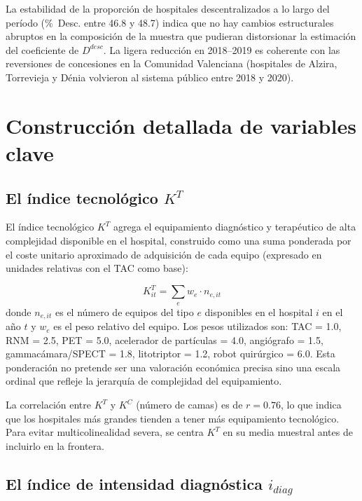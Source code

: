 \documentclass[12pt, a4paper, twoside, openright]{book}
\theoremstyle{plain}
\theoremstyle{definition}
\theoremstyle{remark}
\begin{document}
La estabilidad de la proporción de hospitales descentralizados a lo largo del período (\%~Desc. entre 46.8 y 48.7) indica que no hay cambios estructurales abruptos en la composición de la muestra que pudieran distorsionar la estimación del coeficiente de $D^{desc}$. La ligera reducción en 2018--2019 es coherente con las reversiones de concesiones en la Comunidad Valenciana (hospitales de Alzira, Torrevieja y Dénia volvieron al sistema público entre 2018 y 2020).

\section{Construcción detallada de variables clave}
\label{sec:construccion_variables}

\subsection{El índice tecnológico \texorpdfstring{$K^T$}{K\^{}T}}

El índice tecnológico $K^T$ agrega el equipamiento diagnóstico y terapéutico de alta complejidad disponible en el hospital, construido como una suma ponderada por el coste unitario aproximado de adquisición de cada equipo (expresado en unidades relativas con el TAC como base):

\begin{equation}
  K^T_{it} = \sum_e w_e \cdot n_{e,it}
  \label{eq:kt}
\end{equation}
donde $n_{e,it}$ es el número de equipos del tipo $e$ disponibles en el hospital $i$ en el año $t$ y $w_e$ es el peso relativo del equipo. Los pesos utilizados son: TAC = 1.0, RNM = 2.5, PET = 5.0, acelerador de partículas = 4.0, angiógrafo = 1.5, gammacámara/SPECT = 1.8, litotriptor = 1.2, robot quirúrgico = 6.0. Esta ponderación no pretende ser una valoración económica precisa sino una escala ordinal que refleje la jerarquía de complejidad del equipamiento.

La correlación entre $K^T$ y $K^C$ (número de camas) es de $r = 0.76$, lo que indica que los hospitales más grandes tienden a tener más equipamiento tecnológico. Para evitar multicolinealidad severa, se centra $K^T$ en su media muestral antes de incluirlo en la frontera.

\subsection{El índice de intensidad diagnóstica \texorpdfstring{$i_{diag}$}{i\_diag}}
\end{document}
